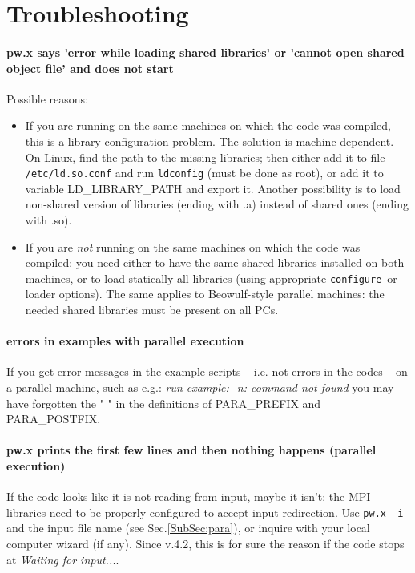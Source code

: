 \documentclass[12pt,a4paper]{article}
\def\configure{\texttt{configure}}
\begin{document}
\section{Troubleshooting}

\paragraph{pw.x says 'error while loading shared libraries' or
  'cannot open shared object file' and does not start} 
Possible reasons:
\begin{itemize}
\item If you are running on the same machines on which the code was
  compiled, this is a library configuration problem. The solution is
  machine-dependent. On Linux, find the path to the missing libraries;
  then either add it to file \texttt{/etc/ld.so.conf} and run \texttt{ldconfig}
   (must be
  done as root), or add it to variable LD\_LIBRARY\_PATH and export
  it. Another possibility is to load non-shared version of libraries
  (ending with .a)  instead of shared ones (ending with .so). 
\item If you are {\em not} running on the same machines on which the
  code was compiled: you need either to have the same shared libraries
  installed on both machines, or to load statically all libraries
  (using appropriate \configure\ or loader options). The same applies to
  Beowulf-style parallel machines: the needed shared libraries must be
  present on all PCs. 
\end{itemize}

\paragraph{errors in examples with parallel execution}

If you get error messages in the example scripts -- i.e. not errors in
the codes -- on a parallel machine, such as e.g.: 
{\em run example: -n: command not found}
you may have forgotten 
the " " in the definitions of PARA\_PREFIX and PARA\_POSTFIX.

\paragraph{pw.x prints the first few lines and then nothing happens
  (parallel execution)} 
If the code looks like it is not reading from input, maybe
it isn't: the MPI libraries need to be properly configured to accept input
redirection. Use \texttt{pw.x -i} and the input file name (see Sec.\ref{SubSec:para}), or inquire with
your local computer wizard (if any). Since v.4.2, this is for sure the
reason if the code stops at {\em Waiting for input...}.
\end{document}
